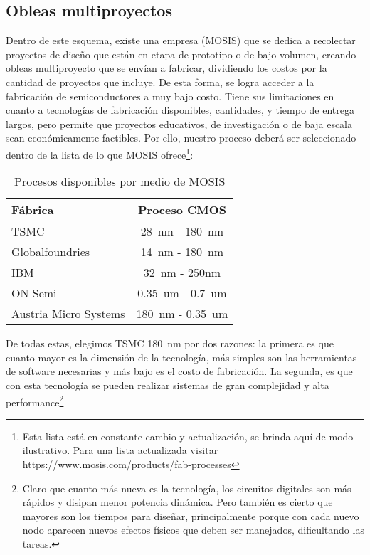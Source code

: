 \subsection{Obleas multiproyectos}
Dentro de este esquema, existe una empresa (MOSIS) que se dedica a recolectar proyectos de diseño que están en etapa de prototipo o de bajo volumen, creando obleas multiproyecto que se envían a fabricar, dividiendo los costos por la cantidad de proyectos que incluye. De esta forma, se logra acceder a la fabricación de semiconductores a muy bajo costo. Tiene sus limitaciones en cuanto a tecnologías de fabricación disponibles, cantidades, y tiempo de entrega largos, pero permite que proyectos educativos, de investigación o de baja escala sean económicamente factibles.
Por ello, nuestro proceso deberá ser seleccionado dentro de la lista de lo que MOSIS ofrece\footnote{Esta lista está en constante cambio y actualización, se brinda aquí de modo ilustrativo. Para una lista actualizada visitar https://www.mosis.com/products/fab-processes }:

\begin{table}[h]
\centering
\begin{tabular}{@{}lc@{}}
\toprule
Fábrica             & Proceso CMOS \\ \midrule
TSMC                & 28~nm - 180~nm             \\
Globalfoundries     & 14~nm - 180~nm             \\
IBM                 & 32~nm -  250nm            \\
ON Semi             & 0.35~um - 0.7~um           \\
Austria Micro Systems & 180~nm - 0.35~um           \\ \bottomrule
\end{tabular}
\caption{Procesos disponibles por medio de MOSIS}
\label{cuadro:procesosDisponibles}
\end{table}

De todas estas, elegimos TSMC 180~nm por dos razones: la primera es que cuanto mayor es la dimensión de la tecnología, más simples son las herramientas de software necesarias y más bajo es el costo de fabricación. La segunda, es que con esta tecnología se pueden realizar sistemas de gran complejidad y alta performance\footnote{Claro que cuanto más nueva es la tecnología, los circuitos digitales son más rápidos y disipan menor potencia dinámica. Pero también es cierto que mayores son los tiempos para diseñar, principalmente porque con cada nuevo nodo aparecen nuevos efectos físicos que deben ser manejados, dificultando las tareas.
}

